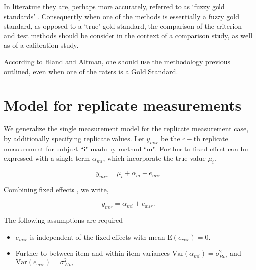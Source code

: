 \documentclass[12pt, a4paper]{report}
\theoremstyle{plain}
\theoremstyle{definition}
\theoremstyle{remark}
\begin{document}
	In literature they are, perhaps more accurately, referred to as
	`fuzzy gold standards' \citep{phelps}. Consequently when one of the methods is
	essentially a fuzzy gold standard, as opposed to a `true' gold
	standard, the comparison of the criterion and test methods should
	be consider in the context of a comparison study, as well as of a
	calibration study.
	
	
	
	
	According to Bland and Altman, one should use the methodology
	previous outlined, even when one of the raters is a Gold Standard.
	
	
	

	\section{Model for replicate measurements}
	
	We generalize the single measurement model for the replicate measurement case, by additionally specifying replicate values. Let $y_{mir}$ be the $r-$th replicate measurement for subject ``i" made by method ``m". Further to \citet{barnhart} fixed effect can be expressed with a single term $\alpha_{mi}$, which incorporate the true value $\mu_i$.
	
	\[ y_{mir} = \mu_{i} + \alpha_{m} + e_{mir}  \]
	
	Combining fixed effects \citep{barnhart}, we write,
	
	\[ y_{mir} = \alpha_{mi} + e_{mir}.\]
	
	The following assumptions are required
	
	\begin{itemize}
		\item $e_{mir}$ is independent of the fixed effects with mean $\mbox{E}(e_{mir}) = 0$.
		\item Further to \citet{barnhart} between-item and within-item variances $\mbox{Var}(\alpha_{mi}) = \sigma^2_{Bm}$ and $\mbox{Var}(e_{mir}) = \sigma^2_{Wm}$
		
	\end{itemize}
	
	
	
	
	
	
\end{document}
